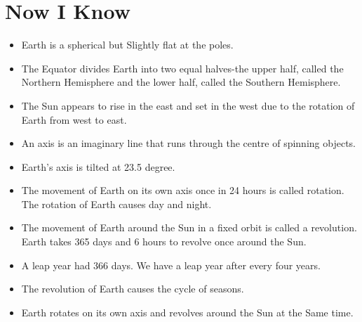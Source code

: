 \section{Now I Know}
\begin{itemize}
    \item Earth is a spherical but Slightly flat at the poles.
    \item The Equator divides Earth into two equal halves-the upper half, called the Northern Hemisphere and the lower half, called the Southern Hemisphere.
    \item The Sun appears to rise in the east and set in the west due to the rotation of Earth from west to east.
    \item An axis is an imaginary line that runs through the centre of spinning objects.
    \item Earth's axis is tilted at 23.5 degree.
    \item The movement of Earth on its own axis once in 24 hours is called rotation. The rotation of Earth causes day and night.
    \item The movement of Earth around the Sun in a fixed orbit is called a revolution. Earth takes 365 days and 6 hours to revolve once around the Sun.
    \item A leap year had 366 days. We have a leap year after every four years.
    \item The revolution of Earth causes the cycle of seasons.
    \item Earth rotates on its own axis and revolves around the Sun at the Same time.
\end{itemize}